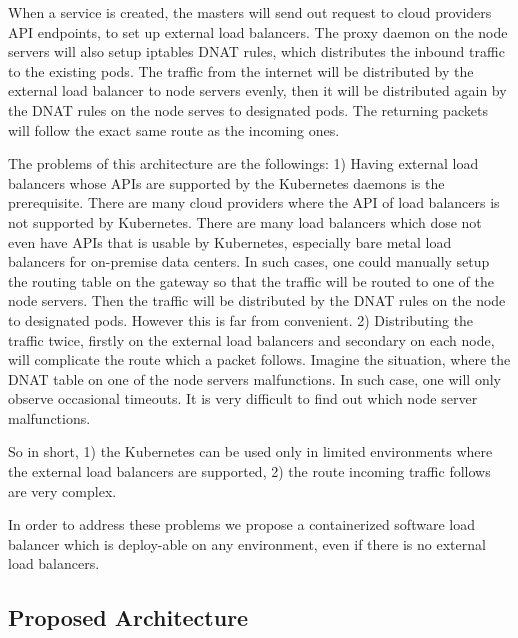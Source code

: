 When a service is created, the masters will send out request to cloud providers API endpoints, 
to set up external load balancers.
The proxy daemon on the node servers will also setup iptables DNAT\cite{MartinA.Brown2017} rules, 
which distributes the inbound traffic to the existing pods.
The traffic from the internet will be distributed by the external load balancer to node servers evenly, 
then it will be distributed again by the DNAT rules on the node serves to designated pods. 
The returning packets will follow the exact same route as the incoming ones.

The problems of this architecture are the followings: 
1) Having external load balancers whose APIs are supported by the Kubernetes daemons is the prerequisite. 
There are many cloud providers where the API of load balancers is not supported by Kubernetes. 
There are many load balancers which dose not even have APIs that is usable by Kubernetes, 
especially bare metal load balancers for on-premise data centers.  
In such cases, one could manually setup the routing table on the gateway so that the traffic will be routed to one of the node servers.
Then the traffic will be distributed by the DNAT rules on the node to designated pods.
However this is far from convenient.
2) Distributing the traffic twice, firstly on the external load balancers and secondary on each node, 
will complicate the route which a packet follows. 
Imagine the situation, where the DNAT table on one of the node servers malfunctions.
In such case, one will only observe occasional timeouts. It is very difficult to find out which node server malfunctions.   

So in short, 1) the Kubernetes can be used only in limited environments where the external load balancers are supported, 
2) the route incoming traffic follows are very complex.

In order to address these problems we propose a containerized software load balancer 
which is deploy-able on any environment, even if there is no external load balancers.

\subsection{Proposed Architecture}

